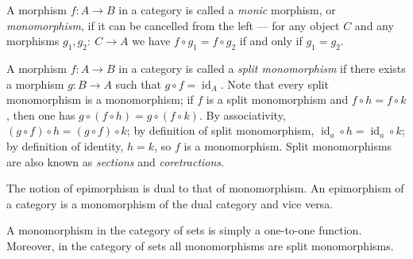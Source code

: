 \documentclass{article}
\begin{document}
A morphism $f \colon A \to B$ in a category is called a {\em monic} morphism, or \emph{monomorphism}, if it can be cancelled from the left --- for any object $C$ and any morphisms $g_1, g_2 \colon\ C\to A$ we have $f \circ g_1 = f \circ g_2$ if and only if $g_1 = g_2$.

A morphism $f : A \to B$ in a category is called a \emph{split monomorphism}
if there exists a morphism $g \colon B \to A$ such that $g \circ f = \operatorname{id}_A$.  Note that every split monomorphism is a monomorphism;
if $f$ is a split monomorphism and $f \circ h = f \circ k$, then one has
$g \circ (f \circ h) = g \circ (f \circ k)$.  By associativity, $(g \circ f)
\circ h = (g \circ f) \circ k$; by definition of split monomorphism,
$\operatorname{id}_a \circ h = \operatorname{id}_a \circ k$; by definition of
identity, $h = k$, so $f$ is a monomorphism.  Split monomorphisms are also
known as \emph{sections} and \emph{coretractions}.

The notion of epimorphism is dual to that of monomorphism.  An epimorphism of
a category is a monomorphism of the dual category and vice versa.

A monomorphism in the category of sets is simply a one-to-one function.
Moreover, in the category of sets all monomorphisms are split monomorphisms.
\end{document}
